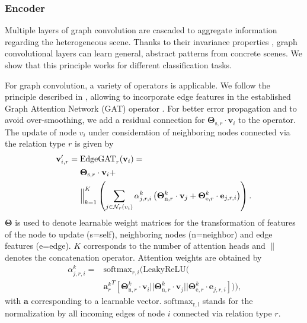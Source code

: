 \documentclass[letterpaper, 10 pt, journal, twoside]{IEEEtran}
\begin{document}
\subsubsection{Encoder}
Multiple layers of graph convolution are cascaded to aggregate information regarding the heterogeneous scene.
Thanks to their invariance properties \cite{Keriven2019}, graph convolutional layers can learn general, abstract patterns from concrete scenes.
We show that this principle works for different classification tasks.

For graph convolution, a variety of operators is applicable.
We follow the principle described in \cite{Wang2021}, allowing to incorporate edge features in the established Graph Attention Network (GAT) operator \cite{Velickovic2018}.
For better error propagation and to avoid over-smoothing, we add a residual connection for $\mathbf{\Theta}_{\mathrm{s}, r} \cdot \mathbf{v}_i$ to the operator.
The update of node $v_i$ under consideration of neighboring nodes connected via the relation type $r$ is given by
\begin{equation}
\begin{aligned}
\mathbf{v}_{i, r}^\prime = {} & \mathrm{EdgeGAT}_r( \mathbf{v}_i ) = \\ &
\mathbf{\Theta}_{\mathrm{s}, r} \cdot \mathbf{v}_i + \\ &
\Big{\|}_{k=1}^K \left( \sum\limits_{j \in \mathcal{N}_r(v_i)} \alpha^k_{j, r, i} \left( \mathbf{\Theta}^k_{\mathrm{n}, r} \cdot \mathbf{v}_j + \mathbf{\Theta}^k_{\mathrm{e}, r} \cdot \mathbf{e}_{j,r,i} \right) \right) \text{.}
\end{aligned}
\end{equation}
$\mathbf{\Theta}$ is used to denote learnable weight matrices for the transformation of features of the node to update (s=self), neighboring nodes (n=neighbor) and edge features (e=edge).
$K$ corresponds to the number of attention heads and ${\|}$ denotes the concatenation operator.
Attention weights are obtained by
\begin{equation}
\begin{aligned}
\alpha^k_{j, r, i} = {} & \mathrm{softmax}_{r, i} \Big( \mathrm{LeakyReLU} \big( \\ & {\mathbf{a}_r^k}^T [ \mathbf{\Theta}^k_{\mathrm{n}, r} \cdot \mathbf{v}_i || \mathbf{\Theta}^k_{\mathrm{n}, r} \cdot \mathbf{v}_j || \mathbf{\Theta}^k_{\mathrm{e}, r} \cdot \mathbf{e}_{j,r,i} ] \big) \Big) \text{,}
\end{aligned}
\end{equation}
with $\mathbf{a}$ corresponding to a learnable vector.
$\mathrm{softmax_{r, i}}$ stands for the normalization by all incoming edges of node $i$ connected via relation type $r$.
\end{document}
